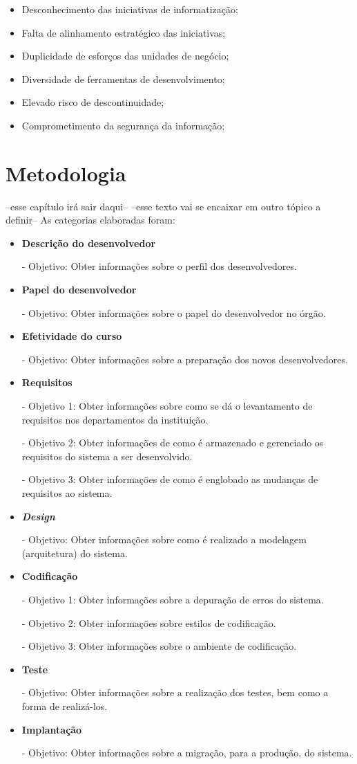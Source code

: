 \begin{itemize}
\item Desconhecimento das iniciativas de informatização;
\item Falta de alinhamento estratégico das iniciativas;
\item Duplicidade de esforços das unidades de negócio;
\item Diversidade de ferramentas de desenvolvimento;
\item Elevado risco de descontinuidade;
\item Comprometimento da segurança da informação;
\end{itemize}

\chapter[Metodologia]{Metodologia}

--esse capítulo irá sair daqui--
--esse texto vai se encaixar em outro tópico a definir--
As categorias elaboradas foram:

\begin{itemize}
\item \textbf{Descrição do desenvolvedor} 

- Objetivo: Obter informações sobre o perfil dos desenvolvedores.
\item \textbf{Papel do desenvolvedor}

- Objetivo: Obter informações sobre o papel do desenvolvedor no órgão.
\item \textbf{Efetividade do curso}

- Objetivo: Obter informações sobre a preparação dos novos desenvolvedores.
\item \textbf{Requisitos}

- Objetivo 1: Obter informações sobre como se dá o levantamento de requisitos nos departamentos da instituição.

- Objetivo 2: Obter informações de como é armazenado e gerenciado os requisitos do sistema a ser desenvolvido.

- Objetivo 3: Obter informações de como é englobado as mudanças de requisitos ao sistema.
\item \textbf{\textit{Design}}

- Objetivo: Obter informações sobre como é realizado a modelagem (arquitetura) do sistema.
\item \textbf{Codificação}

- Objetivo 1: Obter informações sobre a depuração de erros do sistema.

- Objetivo 2: Obter informações sobre estilos de codificação.

- Objetivo 3: Obter informações sobre o ambiente de codificação.

\item \textbf{Teste}

- Objetivo: Obter informações sobre a realização dos testes, bem como a forma de realizá-los.
\item \textbf{Implantação}

- Objetivo: Obter informações sobre a migração, para a produção, do sistema.
\end{itemize}


